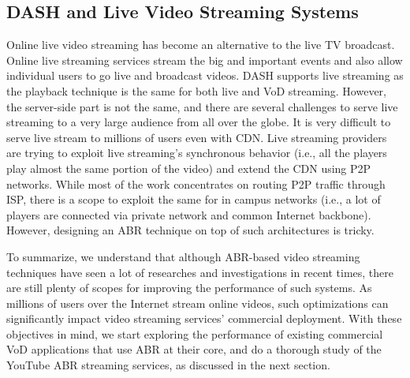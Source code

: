 \subsection{DASH and Live Video Streaming Systems}
Online live video streaming has become an alternative to the live \ac{TV} broadcast. Online live streaming services stream the big and important events and also allow individual users to go live and broadcast videos. \ac{DASH} supports live streaming as the playback technique is the same for both live and \ac{VoD} streaming. However, the server-side part is not the same, and there are several challenges to serve live streaming to a very large audience from all over the globe. It is very difficult to serve live stream to millions of users even with \ac{CDN}. Live streaming providers are trying to exploit live streaming's synchronous behavior (i.e., all the players play almost the same portion of the video) and extend the \ac{CDN} using \ac{P2P} networks. While most of the work concentrates on routing \ac{P2P} traffic through \ac{ISP}, there is a scope to exploit the same for in campus networks (i.e., a lot of players are connected via private network and common Internet backbone). However, designing an \ac{ABR} technique on top of such architectures is tricky.

To summarize, we understand that although \ac{ABR}-based video streaming techniques have seen a lot of researches and investigations in recent times, there are still plenty of scopes for improving the performance of such systems. As millions of users over the Internet stream online videos, such optimizations can significantly impact video streaming services' commercial deployment. With these objectives in mind, we start exploring the performance of existing commercial \ac{VoD} applications that use \ac{ABR} at their core, and do a thorough study of the YouTube \ac{ABR} streaming services, as discussed in the next section.
